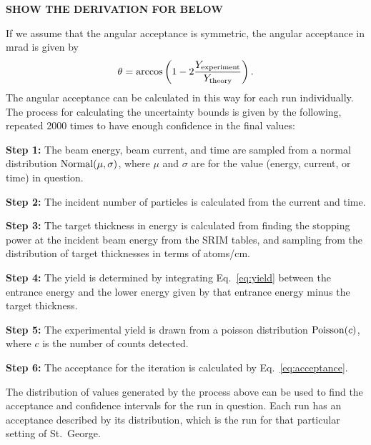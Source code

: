 \textbf{SHOW THE DERIVATION FOR BELOW}

If we assume that the angular acceptance is symmetric, the angular
acceptance in mrad is given by
\begin{equation}
    \label{eq:acceptance}
    \theta = \arccos\left(1 - 2 \frac{Y_{\rm experiment}}
        {Y_{\rm theory}}\right).
\end{equation}
The angular acceptance can be calculated in this way for each run
individually. The process for calculating the uncertainty bounds is
given by the following, repeated 2000 times to have enough confidence in
the final values:

\textbf{Step 1:}
  The beam energy, beam current, and time are sampled from a normal
  distribution ${\rm Normal}(\mu,\sigma)$, where $\mu$ and $\sigma$ are
  for the value (energy, current, or time) in question.

\textbf{Step 2:}
  The incident number of particles is calculated from the current and
  time.

\textbf{Step 3:}
  The target thickness in energy is calculated from finding the stopping
  power at the incident beam energy from the SRIM tables, and sampling
  from the distribution of target thicknesses in terms of
  atoms/cm\squared{}.

\textbf{Step 4:}
  The yield is determined by integrating Eq.~\ref{eq:yield} between the
  entrance energy and the lower energy given by that entrance energy
  minus the target thickness.

\textbf{Step 5:}
  The experimental yield is drawn from a poisson distribution
  ${\rm Poisson}(c)$, where $c$ is the number of counts detected.

\textbf{Step 6:}
  The acceptance for the iteration is calculated by
  Eq.~\ref{eq:acceptance}.

The distribution of values generated by the process above can be used to
find the acceptance and confidence intervals for the run in question.
Each run has an acceptance described by its distribution, which is the
run for that particular setting of St.\ George.
